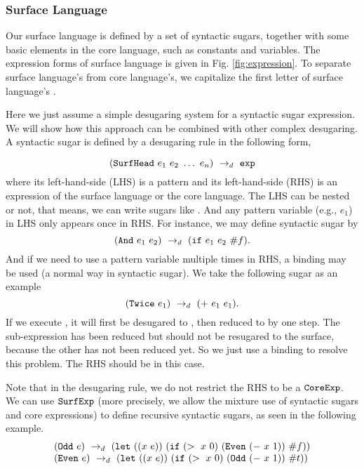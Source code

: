 
\subsubsection{Surface Language}

Our surface language is defined by a set of syntactic sugars, together with some basic elements in the core language, such as constants and variables. The expression forms of surface language is given in Fig.  \ref{fig:expression}. To separate surface language's  from core language's, we capitalize the first letter of surface language's .

Here we just assume a simple desugaring system for a syntactic sugar expression. We will show how this approach can be combined with other complex desugaring. A syntactic sugar is defined by a desugaring rule in the following form,

\[
\drule{(\m{SurfHead}~e_1~e_2~\ldots~e_n)}{\m{exp}} %
\]
where its left-hand-side (LHS) is a pattern and its left-hand-side (RHS) is an expression of the surface language or the core language. The LHS can be nested or not, that means, we can write sugars like . And any pattern variable (e.g., $e_1$) in LHS only appears once in RHS. For instance, we may define syntactic sugar  by
\[
(\mbox{\tt And}~e_1~e_2) ~\rightarrow_d~ (\mbox{\tt if}~e_1~e_2~\#f).
\]
And if we need to use a pattern variable multiple times in RHS, a  binding may be used (a normal way in syntactic sugar). We take the following sugar as an example
\[
(\mbox{\tt Twice}~e_1) ~\rightarrow_d~ (+~e_1~e_1).
\]
If we execute , it will first be desugared to , then reduced to  by one step. The sub-expression  has been reduced but should not be resugared to the surface, because the other  has not been reduced yet.
So we just use a  binding to resolve this problem. The RHS should be  in this case.


Note that in the desugaring rule, we do not restrict the RHS to be a $\mbox{\tt CoreExp}$. We can use $\mbox{\tt SurfExp}$ (more precisely, we allow the mixture use of syntactic sugars and core expressions) to define recursive syntactic sugars, as seen in the following example.
\[
\begin{array}{l}
(\mbox{\tt Odd}~e) ~\rightarrow_d~ (\mbox{\tt let}~((x~e))~(\mbox{\tt if}~(>~x~0)~(\mbox{\tt Even}~(-~x~1))~\#f))\\
(\mbox{\tt Even}~e) ~\rightarrow_d~ (\mbox{\tt let}~((x~e))~(\mbox{\tt if}~(>~x~0)~(\mbox{\tt Odd}~(-~x~1))~\#t))
\end{array}
\]

